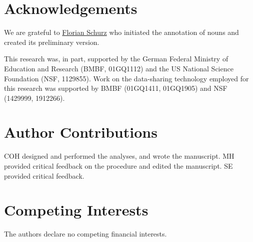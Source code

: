 \documentclass[english,11pt]{article}
\begin{document}
%
%


\section*{Acknowledgements}


We are grateful to \href{www.florianschurz.de}{Florian Schurz} who initiated the
annotation of nouns and created its preliminary version.%

This research was, in part, supported by the German Federal Ministry of
Education and Research (BMBF, 01GQ1112) and the US National Science Foundation
(NSF, 1129855). Work on the data-sharing technology employed for this research
was supported by BMBF (01GQ1411, 01GQ1905) and NSF (1429999, 1912266).


\section*{Author Contributions}

COH designed and performed the analyses, and wrote the manuscript.
%
MH provided critical feedback on the procedure and edited the manuscript.
%
SE provided critical feedback.


\section*{Competing Interests}

The authors declare no competing financial interests.
\end{document}
